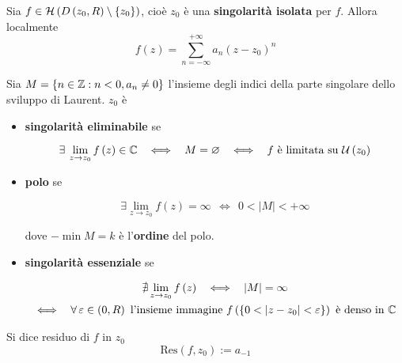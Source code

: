 \Soluzione
\begin{thm}
Sia $f\in \mathcal{H} \left( D\left( z_{0} ,R\right) \setminus \left\{z_{0}\right\}\right)$, cioè $z_{0}$ è una \textbf{singolarità isolata} per $f$. Allora localmente
\begin{equation*}
f\left( z\right) =\sum\limits ^{+\infty }_{n=-\infty } a_{n}\left( z-z_{0}\right)^{n}
\end{equation*}
\end{thm}
\begin{thm}
Sia $M=\left\{n\in \mathbb{Z}  :n< 0,a_{n} \neq 0\right\}$ l'insieme degli indici della parte singolare dello sviluppo di Laurent. $z_{0}$ è

\begin{itemize}
\item \textbf{singolarità eliminabile} se

\begin{equation*}
\exists \lim\limits _{z\rightarrow z_{0}} f\left( z\right) \in \CC  \ \ \iff \ \ M=\emptyset \ \ \iff \ \ f\ \text{è limitata su} \ \Uc \left( z_{0}\right)
\end{equation*}
\item \textbf{polo} se

\begin{equation*}
\exists \lim\limits _{z\rightarrow z_{0}} f\left( z\right) =\infty \ \ \iff \ \ 0< \left| M\right| < +\infty 
\end{equation*}

dove $-\min M=k$ è l'\textbf{ordine} del polo.
\item \textbf{singolarità essenziale} se

\begin{gather*}
\nexists \lim\limits _{z\rightarrow z_{0}} f\left( z\right) \ \ \iff \ \ \left| M\right| =\infty \\
\iff \ \ \forall \varepsilon \in \left( 0,R\right) \ \text{l'insieme immagine} \ f\left(\left\{0< \left| z-z_{0}\right| < \varepsilon \right\}\right) \ \text{è denso in} \ \CC 
\end{gather*}
\end{itemize}
\end{thm}
\begin{defn}
Si dice residuo di $f$ in $z_{0}$
\begin{equation*}
\mathrm{Res}\left( f,z_{0}\right) :=a_{-1}
\end{equation*}
\end{defn}
